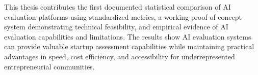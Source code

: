 This thesis contributes the first documented statistical comparison of AI evaluation platforms using standardized metrics, a working proof-of-concept system demonstrating technical feasibility, and empirical evidence of AI evaluation capabilities and limitations. The results show AI evaluation systems can provide valuable startup assessment capabilities while maintaining practical advantages in speed, cost efficiency, and accessibility for underrepresented entrepreneurial communities.